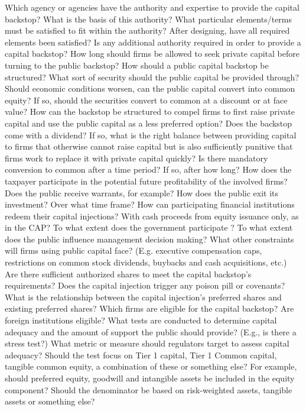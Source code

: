 \documentclass[12pt]{article}
\begin{document}
\begin{outline}[enumerate]

\1 Which agency or agencies have the authority and expertise to provide the capital backstop?
\2 What is the basis of this authority?
\2 What particular elements/terms must be satisfied to fit within the authority?
\2 After designing, have all required elements been satisfied?
\2 Is any additional authority required in order to provide a capital backstop?
\2 How long should firms be allowed to seek private capital before turning to the public backstop?
\1 How should a public capital backstop be structured?
\2 What sort of security should the public capital be provided through?
\2 Should economic conditions worsen, can the public capital convert into common equity?
\3 If so, should the securities convert to common at a discount or at face value?
\2 How can the backstop be structured to compel firms to first raise private capital and use the public capital as a less preferred option?
\2 Does the backstop come with a dividend? If so, what is the right balance between providing capital to firms that otherwise cannot raise capital but is also sufficiently punitive that firms work to replace it with private capital quickly?
\2 Is there mandatory conversion to common after a time period? If so, after how long?
\2 How does the taxpayer participate in the potential future profitability of the involved firms? Does the public receive warrants, for example?
\2 How does the public exit its investment? Over what time frame?
\2 How can participating financial institutions redeem their capital injections? With cash proceeds from equity issuance only, as in the CAP?
\1 To what extent does the government participate ?
\2 To what extent does the public influence management decision making?
\2 What other constraints will firms using public capital face? (E.g. executive compensation caps, restrictions on common stock dividends, buybacks and cash acquisitions, etc.)
\2 Are there sufficient authorized shares to meet the capital backstop's requirements?
\2 Does the capital injection trigger any poison pill or covenants?
\2 What is the relationship between the capital injection's preferred shares and existing preferred shares?
\1 Which firms are eligible for the capital backstop?
\2 Are foreign institutions eligible?
\2 What tests are conducted to determine capital adequacy and the amount of support the public should provide? (E.g., is there a stress test?)
\2 What metric or measure should regulators target to assess capital adequacy?
\3 Should the test focus on Tier 1 capital, Tier 1 Common capital, tangible common equity, a combination of these or something else?
\4 For example, should preferred equity, goodwill and intangible assets be included in the equity component?
\4 Should the denominator be based on risk-weighted assets, tangible assets or something else?

\end{outline}
\end{document}
